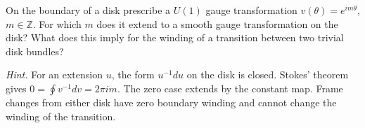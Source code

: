 \begin{exercise}
On the boundary of a disk prescribe a $U(1)$ gauge transformation $v(\theta)=e^{im\theta}$, $m\in\mathbb Z$. For which $m$ does it extend to a smooth gauge transformation on the disk? What does this imply for the winding of a transition between two trivial disk bundles?

\emph{Hint.} For an extension $u$, the form $u^{-1}du$ on the disk is closed. Stokes' theorem gives $0=\oint v^{-1}dv=2\pi i m$. The zero case extends by the constant map. Frame changes from either disk have zero boundary winding and cannot change the winding of the transition.
\end{exercise}
